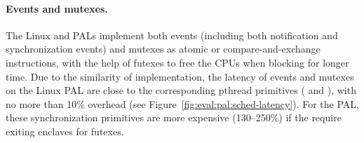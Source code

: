 \paragraph{Events and mutexes.}
The Linux and \sgx{} PALs
implement both
events (including both notification and synchronization events)
and mutexes
as atomic or compare-and-exchange instructions,
with the help of futexes
to free the CPUs when blocking for longer time.
Due to the similarity
of implementation,
the latency of events and mutexes on the Linux PAL
are close to
the corresponding pthread primitives
( and ),
with no more than 10\% overhead (see Figure~\ref{fig:eval:pal:sched-latency}).
For the \sgx{} PAL,
these synchronization primitives
are more expensive
(\roughly{}130--250\%)
if the \hostapis{} require exiting enclaves for futexes.









 



